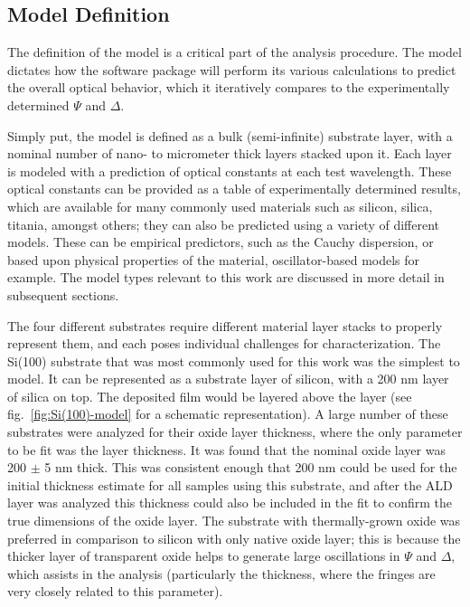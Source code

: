 
\subsection{Model Definition}

The definition of the model is a critical part of the analysis procedure. The model dictates how the software package will perform its various calculations to predict the overall optical behavior, which it iteratively compares to the experimentally determined $\Psi$ and $\Delta$. 

Simply put, the model is defined as a bulk (semi-infinite) substrate layer, with a nominal number of nano- to micrometer thick layers stacked upon it. Each layer is modeled with a prediction of optical constants at each test wavelength. These optical constants can be provided as a table of experimentally determined results, which are available for many commonly used materials such as silicon, silica, titania, amongst others; they can also be predicted using a variety of different models. These can be empirical predictors, such as the Cauchy dispersion, or based upon physical properties of the material, oscillator-based models for example. The model types relevant to this work are discussed in more detail in subsequent sections. 

The four different substrates require different material layer stacks to properly represent them, and each poses individual challenges for characterization. The Si(100) substrate that was most commonly used for this work was the simplest to model. It can be represented as a substrate layer of silicon, with a 200 nm layer of silica on top. The deposited film would be layered above the  layer (see fig.~\vref{fig:Si(100)-model} for a schematic representation). A large number of these substrates were analyzed for their oxide layer thickness, where the only parameter to be fit was the layer thickness. It was found that the nominal oxide layer was 200 $\pm$ 5 nm thick. This was consistent enough that 200 nm could be used for the initial thickness estimate for all samples using this substrate, and after the ALD layer was analyzed this thickness could also be included in the fit to confirm the true dimensions of the oxide layer. The substrate with thermally-grown oxide was preferred in comparison to silicon with only native oxide layer; this is because the thicker layer of transparent oxide helps to generate large oscillations in $\Psi$ and $\Delta$, which assists in the analysis (particularly the thickness, where the fringes are very closely related to this parameter). 

